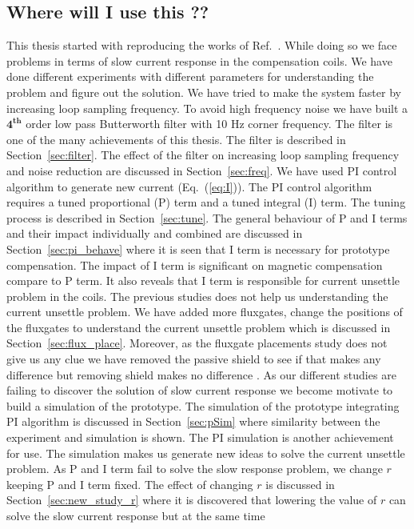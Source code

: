 \subsection{Where will I use this ??}
This thesis started with reproducing the works of
Ref.~\cite{bea}. While doing so we face problems in terms of slow
current response in the compensation coils. We have done different
experiments with different parameters for understanding the problem
and figure out the solution. We have tried to make the system faster
by increasing loop sampling frequency. To avoid high frequency noise
we have built a $\mathbf{4^{th}}$ order low pass Butterworth filter
with 10 Hz corner frequency. The filter is one of the many
achievements of this thesis. The filter is described in
Section~\ref{sec:filter}. The effect of the filter on increasing loop
sampling frequency and noise reduction are discussed in
Section~\ref{sec:freq}. We have used PI control algorithm to generate
new current (Eq.~(\ref{eq:I})). The PI control algorithm requires a
tuned proportional (P) term and a tuned integral (I) term. The tuning
process is described in Section~\ref{sec:tune}. The general behaviour
of P and I terms and their impact individually and combined are
discussed in Section~\ref{sec:pi_behave} where it is seen that I term
is necessary for prototype compensation. The impact of I term is
significant on magnetic compensation compare to P term. It also
reveals that I term is responsible for current unsettle problem in the
coils. The previous studies does not help us understanding the current
unsettle problem. We have added more fluxgates, change the positions
of the fluxgates to understand the current unsettle problem which is
discussed in Section~\ref{sec:flux_place}. Moreover, as the fluxgate
placements study does not give us any clue we have removed the passive
shield to see if that makes any difference but removing shield makes
no difference . As our different studies are failing to discover the
solution of slow current response we become motivate to build a
simulation of the prototype. The simulation of the prototype
integrating PI algorithm is discussed in Section~\ref{sec:pSim} where
similarity between the experiment and simulation is shown. The PI
simulation is another achievement for use. The simulation makes us
generate new ideas to solve the current unsettle problem. As P and I
term fail to solve the slow response problem, we change $r$ keeping P
and I term fixed. The effect of changing $r$ is discussed in
Section~\ref{sec:new_study_r} where it is discovered that lowering the
value of $r$ can solve the slow current response but at the same time

